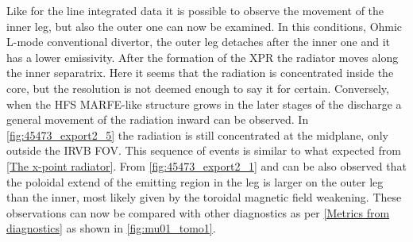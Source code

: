 Like for the line integrated data it is possible to observe the movement of the inner leg, but also the outer one can now be examined. In this conditions, Ohmic L-mode conventional divertor, the outer leg detaches after the inner one and it has a lower emissivity. After the formation of the XPR the radiator moves along the inner separatrix. Here it seems that the radiation is concentrated inside the core, but the resolution is not deemed enough to say it for certain. Conversely, when the HFS MARFE-like structure grows in the later stages of the discharge a general movement of the radiation inward can be observed. In \autoref{fig:45473_export2_5} the radiation is still concentrated at the midplane, only outside the IRVB FOV. This sequence of events is similar to what expected from \autoref{The x-point radiator}. From \autoref{fig:45473_export2_1} and  can be also observed that the poloidal extend of the emitting region in the leg is larger on the outer leg than the inner, most likely given by the toroidal magnetic field weakening.
These observations can now be compared with other diagnostics as per \autoref{Metrics from diagnostics} as shown in \autoref{fig:mu01_tomo1}.
